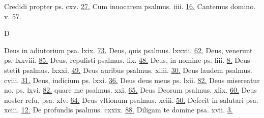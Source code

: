 \documentclass[a5paper,10pt]{book}
\begin{document}
\begin{multicols}{2}
\newline Credidi propter ps. cxv. \hfill \hyperlink{ps115}{27.}
\newline Cum inuocarem psalmus. iiii. \hfill \hyperlink{ps4}{16.}
\newline Cantemus domino. v. \hfill \hyperlink{Exodus}{57.}
\newline \vspace{-1.75em}
\begin{center}
\color{red} D
\end{center}
\vspace{-.75em}
\par \noindent Deus in adiutorium psa. lxix. \hfill \hyperlink{ps69}{73.}
\newline Deus, quis psalmus. lxxxii. \hfill \hyperlink{ps82}{62.}
\newline Deus, venerunt ps. lxxviii. \hfill \hyperlink{ps78}{85.}
\newline Deus, repulisti psalmus. lix. \hfill \hyperlink{ps59}{48.}
\newline Deus, in nomine ps. liii. \hfill \hyperlink{ps53}{8.}
\newline Deus stetit psalmus. lxxxi. \hfill \hyperlink{ps81}{49.}
\newline Deus auribus psalmus. xliii. \hfill \hyperlink{ps43}{30.}
\newline Deus laudem psalmus. cviii. \hfill \hyperlink{ps108}{31.}
\newline Deus, iudicium ps. lxxi. \hfill \hyperlink{ps71}{36.}
\newline Deus deus meus ps. lxii. \hfill \hyperlink{ps62}{82.}
\newline Deus misereatur no. ps. lxvi. \hfill \hyperlink{ps66}{82.}
\newline \indent quare me psalmus. xxi. \hfill \hyperlink{ps21}{65.}
\newline Deus Deorum psalmus. xlix. \hfill \hyperlink{ps49}{60.}
\newline Deus noster refu. psa. xlv. \hfill \hyperlink{ps45}{64.}
\newline Deus vltionum psalmus. xciii. \hfill \hyperlink{ps93}{50.}
\newline Defecit in salutari psa. xciii. \hfill \hyperlink{ps118.6}{12.}
\newline De profundis psalmus. cxxix. \hfill \hyperlink{ps129}{88.}
\newline Diligam te domine psa. xvii. \hfill \hyperlink{ps17}{3.}

\end{multicols}
\end{document}
